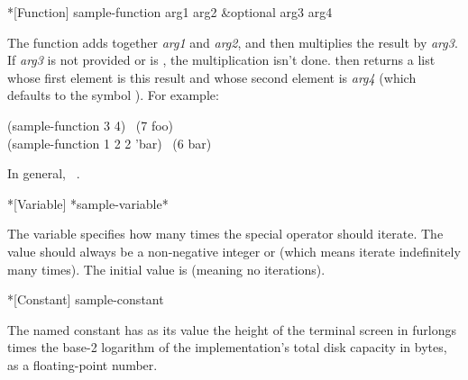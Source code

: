 \begin{table}[t]
\caption{Sample Function Description}
\label{Sample-Function-Description}
\begin{defun}*[Function]
sample-function arg1 arg2 &optional arg3 arg4

The function  adds together \emph{arg1} and \emph{arg2}, and
then multiplies the result by \emph{arg3}.  If \emph{arg3} is not provided or
is {\nil}, the multiplication isn't done.   then returns
a list whose first element is this result and whose second element is
\emph{arg4} (which defaults to the symbol ).
For example: 
\begin{lisp}
(sample-function 3 4) \EV\ (7 foo) \\
(sample-function 1 2 2 'bar) \EV\ (6 bar)
\end{lisp}
In general,
 \EQ\ .
\end{defun}
\caption{Sample Variable Description}
\label{Sample-Variable-Description}
\begin{defun}*[Variable]
*sample-variable*

The variable  specifies how many times
the special operator  should iterate.
The value should always be a non-negative integer or {\nil}
(which means iterate indefinitely many times).  The initial value is 
(meaning no iterations).
\end{defun}
\caption{Sample Constant Description}
\label{Sample-Constant-Description}
\begin{defun}*[Constant]
sample-constant

The named constant  has as its value
the height of the terminal screen in furlongs times
the base-2 logarithm of the implementation's total disk capacity in bytes,
as a floating-point number.
\end{defun}
\end{table}

